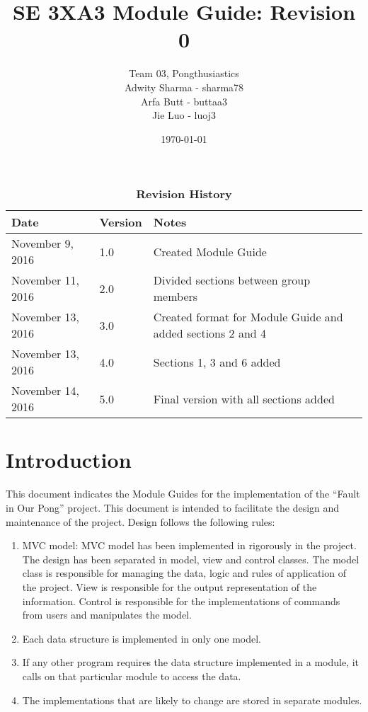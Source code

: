 \documentclass[12pt,letterpaper]{article}
\title{SE 3XA3 Module Guide: Revision 0}
\author{Team 03, Pongthusiastics 		
\\ Adwity Sharma - sharma78 		
\\ Arfa Butt - buttaa3 	
	\\ Jie Luo - luoj3 }
\date{\today}
\begin{document}
\maketitle
\newpage
\tableofcontents

\listoftables
\listoffigures
\begin{table}[h]
\caption{\bf Revision History}
\begin{tabularx}{\textwidth}{p{3.5cm}p{2cm}X}
\toprule {\bf Date} & {\bf Version} & {\bf Notes}\\
\midrule
November 9, 2016 & 1.0 & Created Module Guide \\
November 11, 2016 & 2.0 & Divided sections between group members \\
November 13, 2016 & 3.0 & Created format for Module Guide and added sections 2 and 4 \\
November 13, 2016 & 4.0 & Sections 1, 3 and 6 added \\
November 14, 2016 & 5.0 & Final version with all sections added\\
\bottomrule
\end{tabularx}
\end{table}

\clearpage
	
	\section{Introduction}
	This document indicates the Module Guides for the implementation of the “Fault in Our Pong” project. This document is intended to facilitate the design and maintenance of the project.   
Design follows the following rules:
\begin{enumerate}
	\item MVC model: MVC model has been implemented in rigorously in the project. The design has been separated in model, view and control classes. The model class is responsible for managing the data, logic and rules of application of the project. View is responsible for the output representation of the information. Control is responsible for the implementations of commands from users and manipulates the model.
	\item Each data structure is implemented in only one model.
	\item If any other program requires the data structure implemented in a module, it calls on that particular module to access the data.
	\item The implementations that are likely to change are stored in separate modules.
\end{enumerate}
\end{document}
